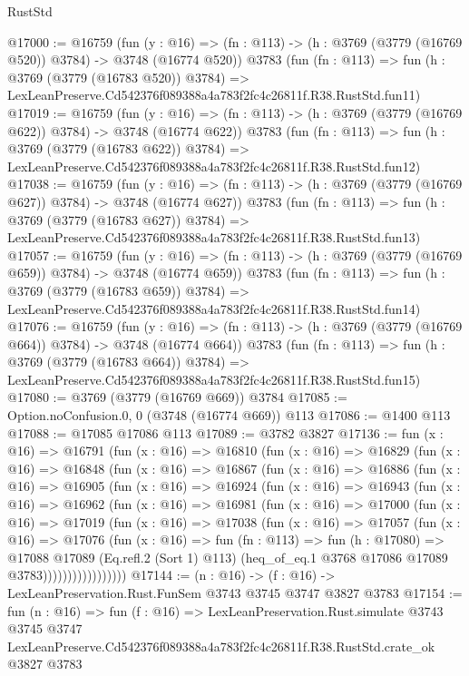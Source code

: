 \begin{lexlean}{RustStd}
\begin{coremodule}
@17000 := @16759
    (fun (y : @16) => (fn : @113) -> (h : @3769 (@3779 (@16769 @520)) @3784) -> @3748 (@16774 @520))
    @3783
    (fun (fn : @113) =>
    fun (h : @3769 (@3779 (@16783 @520)) @3784) =>
    LexLeanPreserve.Cd542376f089388a4a783f2fc4c26811f.R38.RustStd.fun11)
@17019 := @16759
    (fun (y : @16) => (fn : @113) -> (h : @3769 (@3779 (@16769 @622)) @3784) -> @3748 (@16774 @622))
    @3783
    (fun (fn : @113) =>
    fun (h : @3769 (@3779 (@16783 @622)) @3784) =>
    LexLeanPreserve.Cd542376f089388a4a783f2fc4c26811f.R38.RustStd.fun12)
@17038 := @16759
    (fun (y : @16) => (fn : @113) -> (h : @3769 (@3779 (@16769 @627)) @3784) -> @3748 (@16774 @627))
    @3783
    (fun (fn : @113) =>
    fun (h : @3769 (@3779 (@16783 @627)) @3784) =>
    LexLeanPreserve.Cd542376f089388a4a783f2fc4c26811f.R38.RustStd.fun13)
@17057 := @16759
    (fun (y : @16) => (fn : @113) -> (h : @3769 (@3779 (@16769 @659)) @3784) -> @3748 (@16774 @659))
    @3783
    (fun (fn : @113) =>
    fun (h : @3769 (@3779 (@16783 @659)) @3784) =>
    LexLeanPreserve.Cd542376f089388a4a783f2fc4c26811f.R38.RustStd.fun14)
@17076 := @16759
    (fun (y : @16) => (fn : @113) -> (h : @3769 (@3779 (@16769 @664)) @3784) -> @3748 (@16774 @664))
    @3783
    (fun (fn : @113) =>
    fun (h : @3769 (@3779 (@16783 @664)) @3784) =>
    LexLeanPreserve.Cd542376f089388a4a783f2fc4c26811f.R38.RustStd.fun15)
@17080 := @3769 (@3779 (@16769 @669)) @3784
@17085 := Option.noConfusion.{0, 0} (@3748 (@16774 @669)) @113
@17086 := @1400 @113
@17088 := @17085 @17086 @113
@17089 := @3782 @3827
@17136 := fun (x : @16) =>
  @16791
    (fun (x : @16) =>
    @16810
      (fun (x : @16) =>
      @16829
        (fun (x : @16) =>
        @16848
          (fun (x : @16) =>
          @16867
            (fun (x : @16) =>
            @16886
              (fun (x : @16) =>
              @16905
                (fun (x : @16) =>
                @16924
                  (fun (x : @16) =>
                  @16943
                    (fun (x : @16) =>
                    @16962
                      (fun (x : @16) =>
                      @16981
                        (fun (x : @16) =>
                        @17000
                          (fun (x : @16) =>
                          @17019
                            (fun (x : @16) =>
                            @17038
                              (fun (x : @16) =>
                              @17057
                                (fun (x : @16) =>
                                @17076
                                  (fun (x : @16) =>
                                  fun (fn : @113) =>
                                  fun (h : @17080) =>
                                  @17088
                                    @17089
                                    (Eq.refl.{2} (Sort 1) @113)
                                    (heq_of_eq.{1} @3768 @17086 @17089 @3783)))))))))))))))))
@17144 := (n : @16) -> (f : @16) -> LexLeanPreservation.Rust.FunSem @3743 @3745 @3747 @3827 @3783
@17154 := fun (n : @16) =>
  fun (f : @16) =>
  LexLeanPreservation.Rust.simulate
    @3743
    @3745
    @3747
    LexLeanPreserve.Cd542376f089388a4a783f2fc4c26811f.R38.RustStd.crate_ok
    @3827
    @3783
\end{coremodule}
\end{lexlean}
